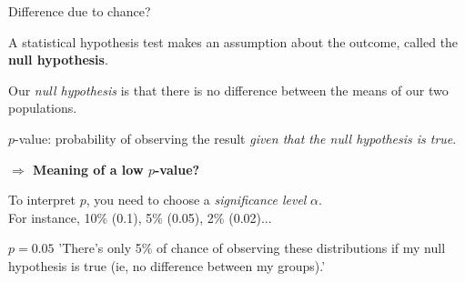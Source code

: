 \documentclass[compress]{beamer}
\begin{document}
\begin{frame}{Difference due to chance?}

    A statistical hypothesis test makes an assumption about the outcome, called
    the \textbf{null hypothesis}.

    Our \emph{null hypothesis} is that there is no difference between the means
    of our two populations.

    \pause

    $p$-value: probability of observing the result \emph{given that the null hypothesis is true}.

    \begin{center}\bf $\Rightarrow$ Meaning of a low $p$-value? \end{center}

    \pause

    To interpret $p$, you need to choose a \emph{significance level} $\alpha$.\\
    For instance, 10\% (0.1), 5\% (0.05), 2\% (0.02)...

    \begin{exampleblock}{$p=0.05$}
        'There's only 5\% of chance of observing these distributions if my null
        hypothesis is true (ie, no difference between my groups).'
    \end{exampleblock}

\end{frame}
\end{document}
